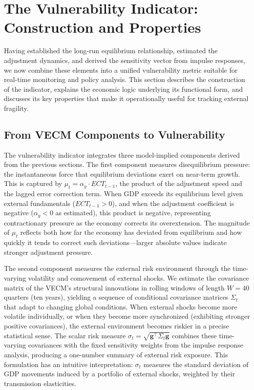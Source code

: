 \documentclass[12pt,a4paper]{article}
\numberwithin{equation}{section}
\theoremstyle{definition}
\theoremstyle{remark}
\newcommand{\vect}[1]{\boldsymbol{#1}}
\begin{document}

\section{The Vulnerability Indicator: Construction and Properties}
\label{sec:indicator}

Having established the long-run equilibrium relationship, estimated the adjustment dynamics, and derived the sensitivity vector from impulse responses, we now combine these elements into a unified vulnerability metric suitable for real-time monitoring and policy analysis. This section describes the construction of the indicator, explains the economic logic underlying its functional form, and discusses its key properties that make it operationally useful for tracking external fragility.


\subsection{From VECM Components to Vulnerability}

The vulnerability indicator integrates three model-implied components derived from the previous sections. The first component measures disequilibrium pressure: the instantaneous force that equilibrium deviations exert on near-term growth. This is captured by $\mu_t = \alpha_y \cdot ECT_{t-1}$, the product of the adjustment speed and the lagged error correction term. When GDP exceeds its equilibrium level given external fundamentals ($ECT_{t-1} > 0$), and when the adjustment coefficient is negative ($\alpha_y < 0$ as estimated), this product is negative, representing contractionary pressure as the economy corrects its overextension. The magnitude of $\mu_t$ reflects both how far the economy has deviated from equilibrium and how quickly it tends to correct such deviations---larger absolute values indicate stronger adjustment pressure.

The second component measures the external risk environment through the time-varying volatility and comovement of external shocks. We estimate the covariance matrix of the VECM's structural innovations in rolling windows of length $W=40$ quarters (ten years), yielding a sequence of conditional covariance matrices $\Sigma_t$ that adapt to changing global conditions. When external shocks become more volatile individually, or when they become more synchronized (exhibiting stronger positive covariances), the external environment becomes riskier in a precise statistical sense. The scalar risk measure $\sigma_t = \sqrt{\vect{g}^\top \Sigma_t \vect{g}}$ combines these time-varying covariances with the fixed sensitivity weights from the impulse response analysis, producing a one-number summary of external risk exposure. This formulation has an intuitive interpretation: $\sigma_t$ measures the standard deviation of GDP movements induced by a portfolio of external shocks, weighted by their transmission elasticities.
\end{document}
